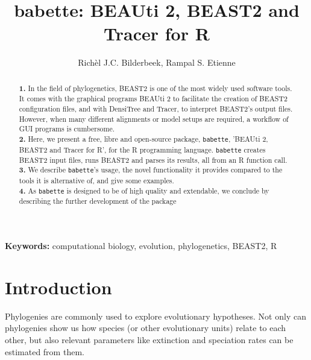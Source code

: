 \documentclass{article}
\title{babette: BEAUti 2, BEAST2 and Tracer for R}
\author{Rich\`el J.C. Bilderbeek, Rampal S. Etienne}
\begin{document}
\maketitle

\begin{abstract}

  \textbf{1. }
    In the field of phylogenetics, 
     BEAST2 is one of the most widely used software tools. 
     It comes with the graphical programs BEAUti 2 to
     facilitate the creation of BEAST2 configuration files, and
     with DensiTree and Tracer, to interpret BEAST2's output files. 
     However, when many different alignments or model 
     setups are required, a workflow of GUI programs is cumbersome. \\
  \textbf{2. }
    Here, we present a free, libre and open-source package, \verb;babette;, 
    'BEAUti 2, BEAST2 and Tracer for R', for the R programming language. 
    \verb;babette; creates BEAST2 input files, runs BEAST2 and parses its results, 
    all from an R function call. \\
  \textbf{3. }
    We describe \verb;babette;'s usage, the novel functionality it provides
    compared to the tools it is alternative of, and give some examples. \\
  \textbf{4. }
    As \verb;babette; is designed to be of high quality and extendable, 
    we conclude by describing the further development of the package \\
\end{abstract}


{\bf Keywords:} computational biology, evolution, phylogenetics, BEAST2, R


\section{Introduction}

Phylogenies are commonly used to explore evolutionary hypotheses.
Not only can phylogenies show us how species (or other
evolutionary units) relate to each other, 
but also relevant parameters like extinction and 
speciation rates can be estimated from them.
\end{document}

